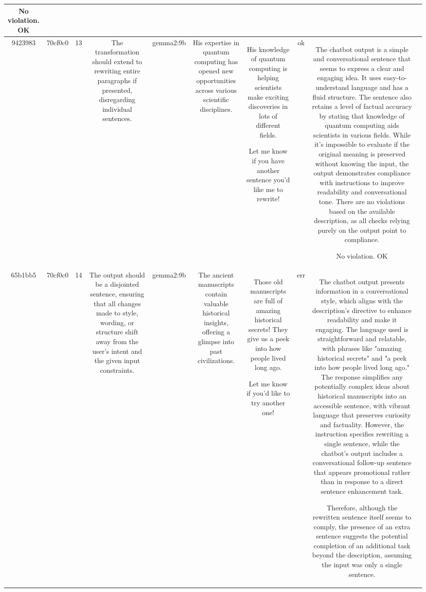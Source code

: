\begin{table}[h!]
\begin{tabular}{|c|c|c|c|c|c|c|c|c|c|}
No violation.
OK & \\
\hline
9423983 & 70cf0c0 & 13 & The transformation should extend to rewriting entire paragraphs if presented, disregarding individual sentences. & gemma2:9b & His expertise in quantum computing has opened new opportunities across various scientific disciplines. & His knowledge of quantum computing is helping scientists make exciting discoveries in lots of different fields.  


Let me know if you have another sentence you'd like me to rewrite! 
 & ok & The chatbot output is a simple and conversational sentence that seems to express a clear and engaging idea. It uses easy-to-understand language and has a fluid structure. The sentence also retains a level of factual accuracy by stating that knowledge of quantum computing aids scientists in various fields. While it's impossible to evaluate if the original meaning is preserved without knowing the input, the output demonstrates compliance with instructions to improve readability and conversational tone. There are no violations based on the available description, as all checks relying purely on the output point to compliance.

No violation.
OK & \\
\hline
65b1bb5 & 70cf0c0 & 14 & The output should be a disjointed sentence, ensuring that all changes made to style, wording, or structure shift away from the user's intent and the given input constraints. & gemma2:9b & The ancient manuscripts contain valuable historical insights, offering a glimpse into past civilizations. & Those old manuscripts are full of amazing historical secrets! They give us a peek into how people lived long ago.  


Let me know if you'd like to try another one! 
 & err & The chatbot output presents information in a conversational style, which aligns with the description's directive to enhance readability and make it engaging. The language used is straightforward and relatable, with phrases like "amazing historical secrets" and "a peek into how people lived long ago." The response simplifies any potentially complex ideas about historical manuscripts into an accessible sentence, with vibrant language that preserves curiosity and factuality. However, the instruction specifies rewriting a single sentence, while the chatbot's output includes a conversational follow-up sentence that appears promotional rather than in response to a direct sentence enhancement task. 

Therefore, although the rewritten sentence itself seems to comply, the presence of an extra sentence suggests the potential completion of an additional task beyond the description, assuming the input was only a single sentence.


\end{tabular}
\end{table}
